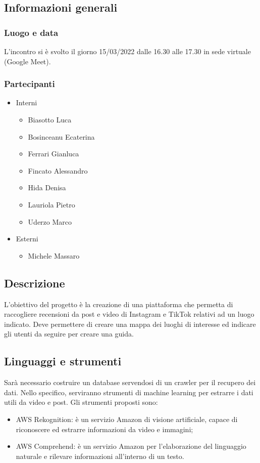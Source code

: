 \documentclass[12pt,a4paper]{article}
\begin{document}
	\subsection{Informazioni generali}
		\subsubsection{Luogo e data}
			L'incontro si è svolto il giorno 15/03/2022 dalle 16.30 alle 17.30 in sede virtuale (Google Meet).
		\subsubsection{Partecipanti}
			\begin{itemize}
			    \item Interni
			    	\begin{itemize}
					    \item Biasotto Luca
		                \item Bosinceanu Ecaterina
		                \item Ferrari Gianluca
		                \item Fincato Alessandro
		                \item Hida Denisa
		                \item Lauriola Pietro
		                \item Uderzo Marco
					\end{itemize}
			    \item Esterni
			    	\begin{itemize}
					    \item Michele Massaro
					\end{itemize}
			\end{itemize}
	\subsection{Descrizione}
		L'obiettivo del progetto è la creazione di una piattaforma che permetta di raccogliere recensioni da post e video di Instagram e TikTok relativi ad un luogo indicato. Deve permettere di creare una mappa dei luoghi di interesse ed indicare gli utenti da seguire per creare una guida. 
	\subsection{Linguaggi e strumenti}
		Sarà necessario costruire un database servendosi di un crawler per il recupero dei dati. Nello specifico, serviranno strumenti di machine learning per estrarre i dati utili da video e post. Gli strumenti proposti sono:
		\begin{itemize}
			\item AWS Rekognition: è un servizio Amazon di visione artificiale, capace di riconoscere ed estrarre informazioni da video e immagini;
			\item AWS Comprehend: è un servizio Amazon per l'elaborazione del linguaggio naturale e rilevare informazioni all'interno di un testo.
		\end{itemize}
\end{document}
